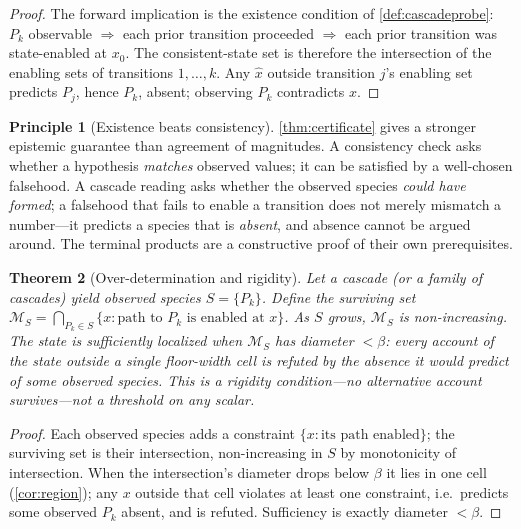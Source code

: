 \documentclass[11pt,a4paper]{article}
\theoremstyle{thmstyle}
\newtheorem{theorem}{Theorem}[section]
\theoremstyle{definition}
\newtheorem{principle}[theorem]{Principle}
\theoremstyle{remark}
\newcommand{\Man}{\mathcal{M}}          %
\newcommand{\st}{x}                     %
\newcommand{\flo}{\beta}                %
\newcommand{\set}[1]{\{#1\}}
\begin{document}
\begin{proof}
The forward implication is the existence condition of \cref{def:cascadeprobe}:
$P_k$ observable $\Rightarrow$ each prior transition proceeded
$\Rightarrow$ each prior transition was state-enabled at $\st_0$. The
consistent-state set is therefore the intersection of the enabling sets of
transitions $1,\dots,k$. Any $\hat\st$ outside transition $j$'s enabling set
predicts $P_j$, hence $P_k$, absent; observing $P_k$ contradicts $\hat\st$.
\end{proof}

\begin{principle}[Existence beats consistency]
\label{prin:existence}
\cref{thm:certificate} gives a stronger epistemic guarantee than agreement
of magnitudes. A consistency check asks whether a hypothesis \emph{matches}
observed values; it can be satisfied by a well-chosen falsehood. A cascade
reading asks whether the observed species \emph{could have formed}; a
falsehood that fails to enable a transition does not merely mismatch a
number---it predicts a species that is \emph{absent}, and absence cannot be
argued around. The terminal products are a constructive proof of their own
prerequisites.
\end{principle}

\begin{theorem}[Over-determination and rigidity]
\label{thm:rigidity}
Let a cascade (or a family of cascades) yield observed species
$S=\set{P_{k}}$. Define the \emph{surviving set}
$\Man_S=\bigcap_{P_k\in S}\set{\st:\text{path to }P_k\text{ is enabled at }\st}$.
As $S$ grows, $\Man_S$ is non-increasing. The state is
\emph{sufficiently localized} when $\Man_S$ has diameter $<\flo$: every
account of the state outside a single floor-width cell is refuted by the
absence it would predict of some observed species. This is a rigidity
condition---\emph{no alternative account survives}---not a threshold on any
scalar.
\end{theorem}

\begin{proof}
Each observed species adds a constraint $\set{\st:\text{its path
enabled}}$; the surviving set is their intersection, non-increasing in $S$
by monotonicity of intersection. When the intersection's diameter drops
below $\flo$ it lies in one cell (\cref{cor:region}); any $\st$ outside
that cell violates at least one constraint, i.e.\ predicts some observed
$P_k$ absent, and is refuted. Sufficiency is exactly diameter $<\flo$.
\end{proof}
\end{document}
